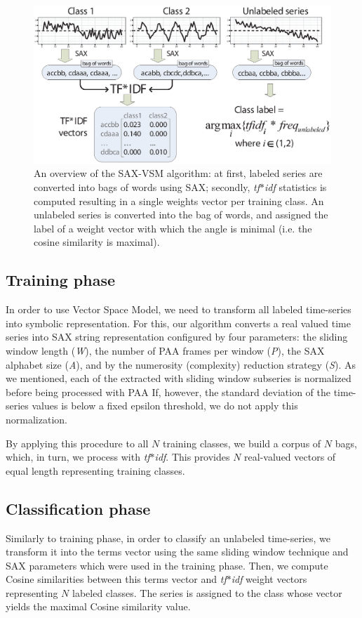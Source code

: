 \documentclass{llncs}
\newcommand{\myfigureshrinker}{\vspace{-1cm}}
\begin{document}
\begin{figure}[t]
   \centering
   \myfigureshrinker
   \includegraphics[width=115mm]{figures/overview.eps}
   \caption{
   An overview of the SAX-VSM algorithm: 
   at first, labeled series are converted into bags of words using SAX; 
   secondly, \textit{tf$\ast$idf} statistics is computed resulting in 
   a single weights vector per training class. An unlabeled series is converted 
   into the bag of words, and assigned the label of a weight vector with which 
   the angle is minimal (i.e. the cosine similarity is maximal).}
   \label{fig:overview}
\end{figure}

\subsection{Training phase}
In order to use Vector Space Model, we need to transform all labeled time-series into 
symbolic representation.  For this, our algorithm converts a real valued time series 
into SAX string representation configured by four parameters: the sliding window
length (\textit{W}), the number of PAA frames per window (\textit{P}), the SAX alphabet size
(\textit{A}), and by the numerosity (complexity) reduction strategy (\textit{S}). 
As we mentioned, each of the extracted with sliding window subseries is normalized
before being processed with PAA 
If, however, 
the standard deviation of the time-series values is below a fixed epsilon threshold, 
we do not apply this normalization.

By applying this procedure to all $N$ training classes, we build a corpus of $N$ bags, 
which, in turn, we process with \textit{tf$\ast$idf}. This provides $N$ real-valued 
vectors of equal length representing training classes. 

\subsection{Classification phase}
Similarly to training phase, in order to classify an unlabeled time-series, we transform it into the
terms vector using the same sliding window technique and SAX parameters which were used 
in the training phase. Then, we compute Cosine similarities between this terms vector and 
\textit{tf$\ast$idf} weight vectors representing $N$ labeled classes. 
The series is assigned to the class whose vector yields the maximal Cosine similarity value.
\end{document}
